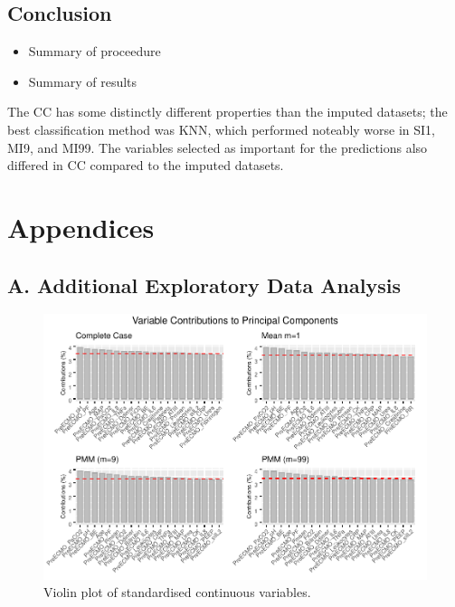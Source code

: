 \documentclass[12pt,]{article}
\providecommand{\tightlist}{%
  \setlength{\itemsep}{0pt}\setlength{\parskip}{0pt}}
\newcommand{\appendixA}{ \setcounter{table}{0} \renewcommand{\thetable}{A\arabic{table}} \setcounter{figure}{0} \renewcommand{\thefigure}{A\arabic{figure}} }
\begin{document}
\subsection{Conclusion}\label{conclusion}

\begin{itemize}
\tightlist
\item
  Summary of proceedure
\item
  Summary of results
\end{itemize}

The CC has some distinctly different properties than the imputed
datasets; the best classification method was KNN, which performed
noteably worse in SI1, MI9, and MI99. The variables selected as
important for the predictions also differed in CC compared to the
imputed datasets.

\newpage

\section*{Appendices}\label{appendices}

\subsection*{A. Additional Exploratory Data
Analysis}\label{a.-additional-exploratory-data-analysis}

\appendixA

\begin{figure}[H]

{\centering \includegraphics[width=1\linewidth]{figure/graphics-unnamed-chunk-9-1} 

}

\caption{\label{fig:violin-standardized}Violin plot of standardised continuous variables.}\label{fig:unnamed-chunk-9}
\end{figure}
\end{document}
